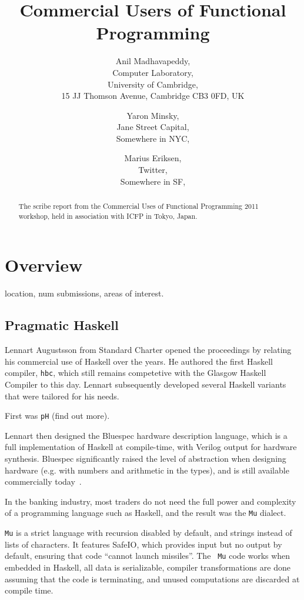 \documentclass{jfp1}
\title[Commercial Users of Functional Programming 2011]{Commercial Users of Functional Programming}
\author[Anil Madhavapeddy]
       {Anil Madhavapeddy,\\
        Computer Laboratory,\\
        University of Cambridge,\\ 
        15 JJ Thomson Avenue, Cambridge CB3 0FD, UK\\
        \email{avsm2@cl.cam.ac.uk}}
\author[Yaron Minsky]
       {Yaron Minsky,\\
        Jane Street Capital,\\
        Somewhere in NYC,\\ 
        \email{yminsky@gmail.com}}
\author[Marius Eriksen]
       {Marius Eriksen,\\
        Twitter,\\
        Somewhere in SF,\\ 
        \email{marius@twitter.com}}
\begin{document}
\label{firstpage}

\maketitle

\begin{abstract}
The scribe report from the Commercial Uses of Functional Programming 2011 workshop, held in association with ICFP in Tokyo, Japan.
\end{abstract}


\section{Overview}

location, num submissions, areas of interest. 

\subsection{Pragmatic Haskell}

Lennart Augustsson from Standard Charter opened the proceedings by relating his
commercial use of Haskell over the years. He authored the first Haskell
compiler, {\tt hbc}, which still remains competetive with the Glasgow Haskell
Compiler to this day.  Lennart subsequently developed several Haskell variants
that were tailored for
his needs.

First was {\tt pH} (find out more).

Lennart then designed the Bluespec hardware description language, which is a
full implementation of Haskell at compile-time, with Verilog output for
hardware synthesis. Bluespec significantly raised the level of abstraction when
designing hardware (e.g. with numbers and arithmetic in the types), and is
still available commercially today~\cite{bluespec}.

In the banking industry, most traders do not need the full power and complexity
of a programming language such as Haskell, and the result was the {\tt Mu}
dialect.

{\tt Mu} is a strict language with recursion disabled by default, and strings
instead of lists of characters.  It features SafeIO, which provides input but
no output by default, ensuring that code ``cannot launch missiles''. The {\tt
Mu} code works when embedded in Haskell, all data is serializable, compiler
transformations are done assuming that the code is terminating, and unused
computations are discarded at compile time.
\end{document}
